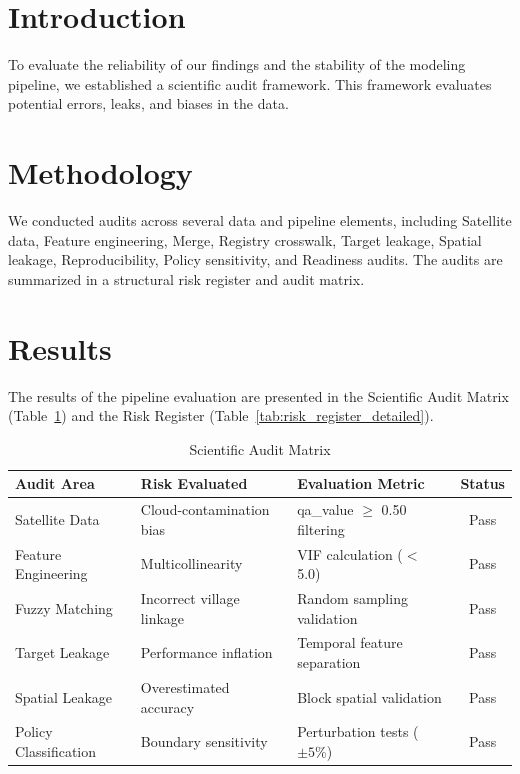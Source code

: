 \documentclass[12pt,a4paper]{report}
\begin{document}
\section{Introduction}
To evaluate the reliability of our findings and the stability of the modeling pipeline, we established a scientific audit framework. This framework evaluates potential errors, leaks, and biases in the data.

\section{Methodology}
We conducted audits across several data and pipeline elements, including Satellite data, Feature engineering, Merge, Registry crosswalk, Target leakage, Spatial leakage, Reproducibility, Policy sensitivity, and Readiness audits. The audits are summarized in a structural risk register and audit matrix.

\section{Results}
The results of the pipeline evaluation are presented in the Scientific Audit Matrix (Table~\ref{tab:audit_matrix_detailed}) and the Risk Register (Table~\ref{tab:risk_register_detailed}).

\begin{table}[H]
\centering
\caption{Scientific Audit Matrix}
\label{tab:audit_matrix_detailed}
\begin{tabular}{lllc}
\toprule
\textbf{Audit Area} & \textbf{Risk Evaluated} & \textbf{Evaluation Metric} & \textbf{Status} \\
\midrule
Satellite Data & Cloud-contamination bias & qa\_value $\ge$ 0.50 filtering & Pass \\
Feature Engineering & Multicollinearity & VIF calculation ($<$ 5.0) & Pass \\
Fuzzy Matching & Incorrect village linkage & Random sampling validation & Pass \\
Target Leakage & Performance inflation & Temporal feature separation & Pass \\
Spatial Leakage & Overestimated accuracy & Block spatial validation & Pass \\
Policy Classification & Boundary sensitivity & Perturbation tests ($\pm 5\%$) & Pass \\
\bottomrule
\end{tabular}
\end{table}
\end{document}
